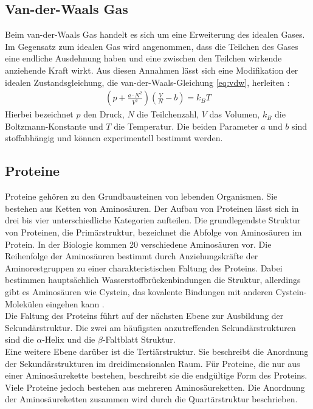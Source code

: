 \subsection{Van-der-Waals Gas}
Beim van-der-Waals Gas handelt es sich um eine Erweiterung des idealen Gases.
Im Gegensatz zum idealen Gas wird angenommen, dass die Teilchen des Gases eine endliche Ausdehnung haben und eine zwischen den Teilchen wirkende anziehende Kraft wirkt.
Aus diesen Annahmen lässt sich eine Modifikation der idealen Zustandsgleichung, die van-der-Waals-Gleichung \ref{eq:vdw}, herleiten \cite{Dem1}:
\begin{align}
\left( p+\frac{a\cdot N^2}{V^2}\right)\left(\frac{V}{N}-b\right) = k_B T \label{eq:vdw}
\end{align}
Hierbei bezeichnet $p$ den Druck, $N$ die Teilchenzahl, $V$ das Volumen, $k_B$ die Boltzmann-Konstante und $T$ die Temperatur.
Die beiden Parameter $a$ und $b$ sind stoffabhängig und können experimentell bestimmt werden.

\subsection{Proteine}
Proteine gehören zu den Grundbausteinen von lebenden Organismen. Sie bestehen aus Ketten von Aminosäuren.
Der Aufbau von Proteinen lässt sich in drei bis vier unterschiedliche Kategorien aufteilen.
Die grundlegendste Struktur von Proteinen, die Primärstruktur, bezeichnet die Abfolge von Aminosäuren im Protein. In der Biologie kommen 20 verschiedene Aminosäuren vor.
Die Reihenfolge der Aminosäuren bestimmt durch Anziehungskräfte der Aminorestgruppen zu einer charakteristischen Faltung des Proteins.
Dabei bestimmen hauptsächlich Wasserstoffbrückenbindungen die Struktur, allerdings gibt es Aminosäuren wie Cystein, das kovalente Bindungen mit anderen Cystein-Molekülen eingehen kann \cite{Campbell}.
\\ \noindent
Die Faltung des Proteins führt auf der nächsten Ebene zur Ausbildung der Sekundärstruktur. Die zwei am häufigsten anzutreffenden Sekundärstrukturen sind die $\alpha$-Helix und die $\beta$-Faltblatt Struktur.
\\ \noindent
Eine weitere Ebene darüber ist die Tertiärstruktur. Sie beschreibt die Anordnung der Sekundärstrukturen im dreidimensionalen Raum. Für Proteine, die nur aus einer Aminosäurekette bestehen, beschreibt sie die endgültige Form des Proteins\cite{Campbell}.
\\ \noindent
Viele Proteine jedoch bestehen aus mehreren Aminosäureketten. Die Anordnung der Aminosäureketten zusammen wird durch die Quartärstruktur beschrieben.
